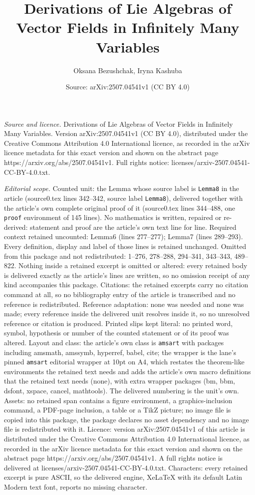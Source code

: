 \documentclass[10pt,a4paper]{amsart}
\title[Derivations of Lie Algebras of Vector Fields in Infinitely M]{Derivations of Lie Algebras of Vector Fields in Infinitely Many Variables}
\author{Oksana Bezushchak, Iryna Kashuba}
\date{Source: arXiv:2507.04541v1 (CC BY 4.0)}
\begin{document}
\maketitle

\noindent\emph{Source and licence.} Derivations of Lie Algebras of Vector Fields in Infinitely Many Variables. Version arXiv:2507.04541v1 (CC BY 4.0), distributed under the Creative Commons Attribution 4.0 International licence, as recorded in the arXiv licence metadata for this exact version and shown on the abstract page https://arxiv.org/abs/2507.04541v1. Full rights notice: licenses/arxiv-2507.04541-CC-BY-4.0.txt.\par\smallskip

\noindent\textit{Editorial scope.} Counted unit: the Lemma whose source label is \texttt{Lemma8} in the article (source0.tex lines 342--342, source label \texttt{Lemma8}), delivered together with the article's own complete original proof of it (source0.tex lines 344--488, one \texttt{proof} environment of 145 lines). No mathematics is written, repaired or re-derived: statement and proof are the article's own text line for line. Required context retained uncounted: Lemma6 (lines 277--277); Lemma7 (lines 289--293). Every definition, display and label of those lines is retained unchanged. Omitted from this package and not redistributed: 1--276, 278--288, 294--341, 343--343, 489--822. Nothing inside a retained excerpt is omitted or altered: every retained body is delivered exactly as the article's lines are written, so no omission receipt of any kind accompanies this package. Citations: the retained excerpts carry no citation command at all, so no bibliography entry of the article is transcribed and no reference is redistributed. Reference adaptation: none was needed and none was made; every reference inside the delivered unit resolves inside it, so no unresolved reference or citation is produced. Printed slips kept literal: no printed word, symbol, hypothesis or number of the counted statement or of its proof was altered. Layout and class: the article's own class is \texttt{amsart} with packages including amsmath, amssymb, hyperref, babel, cite; the wrapper is the lane's pinned \texttt{amsart} editorial wrapper at 10pt on A4, which restates the theorem-like environments the retained text needs and adds the article's own macro definitions that the retained text needs (none), with extra wrapper packages (bm, bbm, dsfont, xspace, cancel, mathtools). The delivered numbering is the unit's own. Assets: no retained span contains a figure environment, a graphics-inclusion command, a PDF-page inclusion, a table or a TikZ picture; no image file is copied into this package, the package declares no asset dependency and no image file is redistributed with it. Licence: version arXiv:2507.04541v1 of this article is distributed under the Creative Commons Attribution 4.0 International licence, as recorded in the arXiv licence metadata for this exact version and shown on the abstract page https://arxiv.org/abs/2507.04541v1. A full rights notice is delivered at licenses/arxiv-2507.04541-CC-BY-4.0.txt. Characters: every retained excerpt is pure ASCII, so the delivered engine, XeLaTeX with its default Latin Modern text font, reports no missing character.
\end{document}
